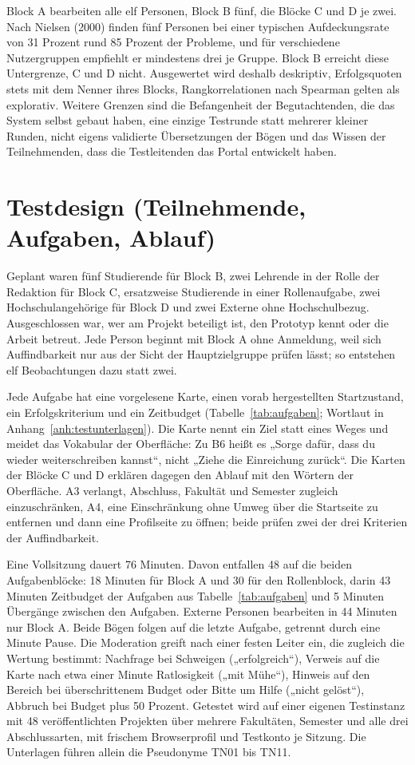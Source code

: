 Block A bearbeiten alle elf Personen, Block B fünf, die Blöcke C und D je zwei. Nach Nielsen (2000) finden fünf Personen bei einer typischen Aufdeckungsrate von 31 Prozent rund 85 Prozent der Probleme, und für verschiedene Nutzergruppen empfiehlt er mindestens drei je Gruppe. Block B erreicht diese Untergrenze, C und D nicht. Ausgewertet wird deshalb deskriptiv, Erfolgsquoten stets mit dem Nenner ihres Blocks, Rangkorrelationen nach Spearman gelten als explorativ. Weitere Grenzen sind die Befangenheit der Begutachtenden, die das System selbst gebaut haben, eine einzige Testrunde statt mehrerer kleiner Runden, nicht eigens validierte Übersetzungen der Bögen und das Wissen der Teilnehmenden, dass die Testleitenden das Portal entwickelt haben.

\section{Testdesign (Teilnehmende, Aufgaben, Ablauf)}
\label{sec:testdesign}

Geplant waren fünf Studierende für Block B, zwei Lehrende in der Rolle der Redaktion für Block C, ersatzweise Studierende in einer Rollenaufgabe, zwei Hochschulangehörige für Block D und zwei Externe ohne Hochschulbezug. Ausgeschlossen war, wer am Projekt beteiligt ist, den Prototyp kennt oder die Arbeit betreut. Jede Person beginnt mit Block A ohne Anmeldung, weil sich Auffindbarkeit nur aus der Sicht der Hauptzielgruppe prüfen lässt; so entstehen elf Beobachtungen dazu statt zwei.

Jede Aufgabe hat eine vorgelesene Karte, einen vorab hergestellten Startzustand, ein Erfolgskriterium und ein Zeitbudget (Tabelle~\ref{tab:aufgaben}; Wortlaut in Anhang~\ref{anh:testunterlagen}). Die Karte nennt ein Ziel statt eines Weges und meidet das Vokabular der Oberfläche: Zu B6 heißt es „Sorge dafür, dass du wieder weiterschreiben kannst“, nicht „Ziehe die Einreichung zurück“. Die Karten der Blöcke C und D erklären dagegen den Ablauf mit den Wörtern der Oberfläche. A3 verlangt, Abschluss, Fakultät und Semester zugleich einzuschränken, A4, eine Einschränkung ohne Umweg über die Startseite zu entfernen und dann eine Profilseite zu öffnen; beide prüfen zwei der drei Kriterien der Auffindbarkeit.

Eine Vollsitzung dauert 76 Minuten. Davon entfallen 48 auf die beiden Aufgabenblöcke: 18 Minuten für Block A und 30 für den Rollenblock, darin 43 Minuten Zeitbudget der Aufgaben aus Tabelle~\ref{tab:aufgaben} und 5 Minuten Übergänge zwischen den Aufgaben. Externe Personen bearbeiten in 44 Minuten nur Block A. Beide Bögen folgen auf die letzte Aufgabe, getrennt durch eine Minute Pause. Die Moderation greift nach einer festen Leiter ein, die zugleich die Wertung bestimmt: Nachfrage bei Schweigen („erfolgreich“), Verweis auf die Karte nach etwa einer Minute Ratlosigkeit („mit Mühe“), Hinweis auf den Bereich bei überschrittenem Budget oder Bitte um Hilfe („nicht gelöst“), Abbruch bei Budget plus 50 Prozent. Getestet wird auf einer eigenen Testinstanz mit 48 veröffentlichten Projekten über mehrere Fakultäten, Semester und alle drei Abschlussarten, mit frischem Browserprofil und Testkonto je Sitzung. Die Unterlagen führen allein die Pseudonyme TN01 bis TN11.


